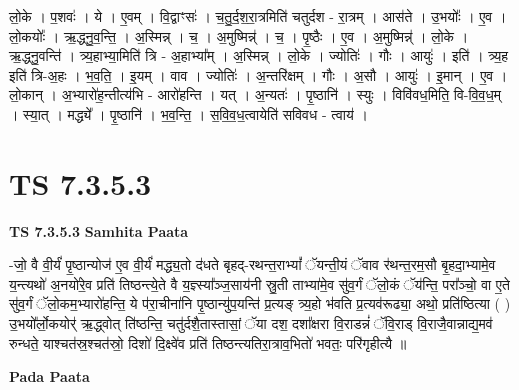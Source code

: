 \documentclass[17pt]{extarticle}
\begin{document}
लो॒के । प॒शवः॑ । ये । ए॒वम् । वि॒द्वाꣳसः॑ । च॒तु॒र्द॒श॒रा॒त्रमिति॑ चतुर्दश - रा॒त्रम् । आस॑ते । उ॒भयोः᳚ । ए॒व । लो॒कयोः᳚ । ऋ॒द्ध्नु॒व॒न्ति॒ । अ॒स्मिन्न् । च॒ । अ॒मुष्मिन्न्॑ । च॒ । पृ॒ष्ठैः । ए॒व । अ॒मुष्मिन्न्॑ । लो॒के । ऋ॒द्ध्नु॒वन्ति॑ । त्र्य॒हाभ्या॒मिति॑ त्रि - अ॒हाभ्या᳚म् । अ॒स्मिन्न् । लो॒के । ज्योतिः॑ । गौः । आयुः॑ । इति॑ । त्र्य॒ह इति॑ त्रि-अ॒हः । भ॒व॒ति॒ । इ॒यम् । वाव । ज्योतिः॑ । अ॒न्तरि॑क्षम् । गौः । अ॒सौ । आयुः॑ । इ॒मान् । ए॒व । लो॒कान् । अ॒भ्यारो॑ह॒न्तीत्य॑भि - आरो॑हन्ति । यत् । अ॒न्यतः॑ । पृ॒ष्ठानि॑ । स्युः । विवि॑वध॒मिति॒ वि-वि॒व॒ध॒म् । स्या॒त् । मद्ध्ये᳚ । पृ॒ष्ठानि॑ । भ॒व॒न्ति॒ । स॒वि॒व॒ध॒त्वायेति॑ सविवध - त्वाय॑ ।  \newline





\section{ TS 7.3.5.3 }

\textbf{TS 7.3.5.3 } \newline
\textbf{Samhita Paata} \newline

-जो॒ वै वी॒र्यं॑ पृ॒ष्ठान्योज॑ ए॒व वी॒र्यं॑ मद्ध्य॒तो द॑धते बृहद्-रथन्त॒राभ्यां᳚ ॅयन्ती॒यं ॅवाव र॑थन्त॒रम॒सौ बृ॒हदा॒भ्यामे॒व य॒न्त्यथो॑ अ॒नयो॑रे॒व प्रति॑ तिष्ठन्त्ये॒ते वै य॒ज्ञ्स्या᳚ञ्ज॒साय॑नी स्रु॒ती ताभ्या॑मे॒व सु॑व॒र्गं ॅलो॒कं ॅय॑न्ति॒ परा᳚ञ्चो॒ वा ए॒ते सु॑व॒र्गं ॅलो॒कम॒भ्यारो॑हन्ति॒ ये प॑रा॒चीना॑नि पृ॒ष्ठान्यु॑प॒यन्ति॑ प्र॒त्यङ् त्र्य॒हो भ॑वति प्र॒त्यव॑रूढ्या॒ अथो॒ प्रति॑ष्ठित्या ( ) उ॒भयो᳚र्लो॒कयोर्॑ ऋ॒द्ध्वोत् ति॑ष्ठन्ति॒ चतु॑र्दशै॒तास्तासां॒ ॅया दश॒ दशा᳚क्षरा वि॒राडन्नं॑ ॅवि॒राड् वि॒राजै॒वान्नाद्य॒मव॑ रुन्धते॒ याश्चत॑स्र॒श्चत॑स्रो॒ दिशो॑ दि॒क्ष्वे॑व प्रति॑ तिष्ठन्त्यतिरा॒त्राव॒भितो॑ भवतः॒ परि॑गृहीत्यै ॥ \newline

\textbf{Pada Paata} \newline
\end{document}
